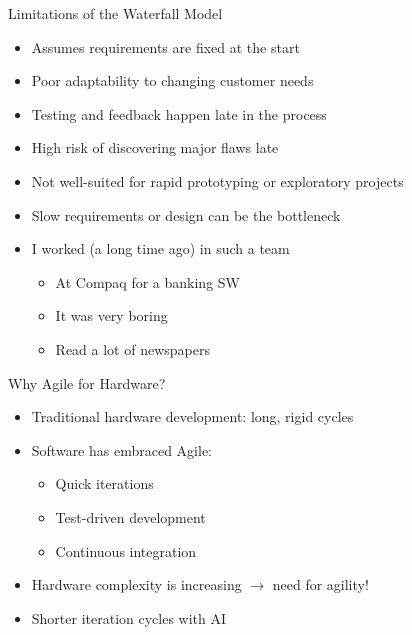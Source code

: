 \begin{frame}{Limitations of the Waterfall Model}
\begin{itemize}
    \item Assumes requirements are fixed at the start
    \item Poor adaptability to changing customer needs
    \item Testing and feedback happen late in the process
    \item High risk of discovering major flaws late
    \item Not well-suited for rapid prototyping or exploratory projects
    \item Slow requirements or design can be the bottleneck
        \item I worked (a long time ago) in such a team

    \begin{itemize}
    \item At Compaq for a banking SW
    \item It was very boring
    \item Read a lot of newspapers
\end{itemize}

\end{itemize}
\end{frame}


\begin{frame}{Why Agile for Hardware?}
\begin{itemize}
    \item Traditional hardware development: long, rigid cycles
    \item Software has embraced Agile:
    \begin{itemize}
        \item Quick iterations
        \item Test-driven development
        \item Continuous integration
    \end{itemize}
    \item Hardware complexity is increasing $\rightarrow$ need for agility!
    \item Shorter iteration cycles with AI
\end{itemize}
\end{frame}

